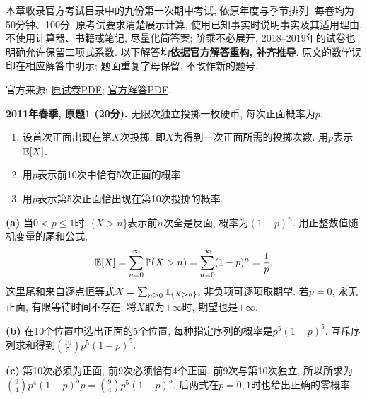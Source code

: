\label{chap:exams-midterm1}
本章收录官方考试目录中的九份第一次期中考试, 依原年度与季节排列. 每卷均为50分钟、100分. 原考试要求清楚展示计算, 使用已知事实时说明事实及其适用理由, 不使用计算器、书籍或笔记, 尽量化简答案; 阶乘不必展开, 2018--2019年的试卷也明确允许保留二项式系数. 以下解答均\textbf{依据官方解答重构, 补齐推导}. 原文的数学误印在相应解答中明示; 题面重复字母保留, 不改作新的题号.

\noindent 官方来源: \href{https://ocw.mit.edu/courses/18-600-probability-and-random-variables-fall-2019/93a853eac855b4de3cbee2b7fa1a761e_MIT18_600F19_mid1_S2011.pdf}{原试卷PDF}; \href{https://ocw.mit.edu/courses/18-600-probability-and-random-variables-fall-2019/61394f8d49ead2d89ee46e87b07a5a14_MIT18_600F19_mid1_S2011_soln.pdf}{官方解答PDF}.
\begin{exercise}\label{ex:m1-2011s-q1}
\textbf{2011年春季, 原题1 (20分).} 无限次独立投掷一枚硬币, 每次正面概率为$p$.
\begin{enumerate}
\item[(a)]\label{ex:m1-2011s-q1-a} 设首次正面出现在第$X$次投掷, 即$X$为得到一次正面所需的投掷次数. 用$p$表示$\mathbb E[X]$.
\item[(b)]\label{ex:m1-2011s-q1-b} 用$p$表示前10次中恰有5次正面的概率.
\item[(c)]\label{ex:m1-2011s-q1-c} 用$p$表示第5次正面恰出现在第10次投掷的概率.
\end{enumerate}
\end{exercise}
\begin{solution}
\textbf{(a)}\label{sol:m1-2011s-q1-a} 当$0<p\le1$时, $\{X>n\}$表示前$n$次全是反面, 概率为$(1-p)^n$. 用正整数值随机变量的尾和公式,
\[
\mathbb E[X]=\sum_{n=0}^{\infty}\mathbb P(X>n)=\sum_{n=0}^{\infty}(1-p)^n=\frac1p.
\]
这里尾和来自逐点恒等式$X=\sum_{n\ge0}\mathbf 1_{\{X>n\}}$, 非负项可逐项取期望. 若$p=0$, 永无正面, 有限等待时间不存在; 将$X$取为$+\infty$时, 期望也是$+\infty$.

\textbf{(b)}\label{sol:m1-2011s-q1-b} 在10个位置中选出正面的5个位置, 每种指定序列的概率是$p^5(1-p)^5$. 互斥序列求和得到$\binom{10}{5}p^5(1-p)^5$.

\textbf{(c)}\label{sol:m1-2011s-q1-c} 第10次必须为正面, 前9次必须恰有4个正面. 前9次与第10次独立, 所以所求为$\binom94p^4(1-p)^5p=\binom94p^5(1-p)^5$. 后两式在$p=0,1$时也给出正确的零概率.
\end{solution}

